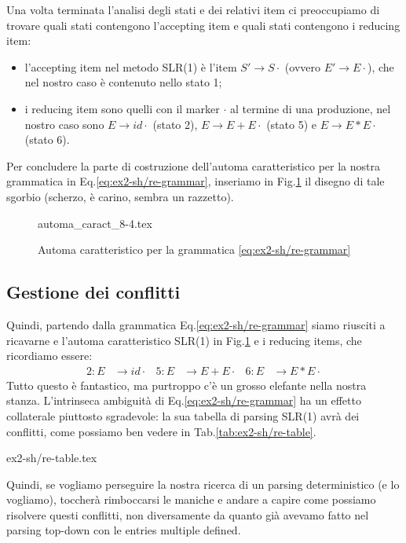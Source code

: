\documentclass[class=book, crop=false, oneside, 12pt]{standalone}
\begin{document}
Una volta terminata l'analisi degli stati e dei relativi item ci preoccupiamo di trovare quali stati contengono l'accepting item e quali stati contengono i reducing item:
\begin{itemize}
    \item l'accepting item nel metodo SLR(1) è l'item \(S' \to S\cdot \) (ovvero \(E' \to E\cdot \)), che nel nostro caso è contenuto nello stato 1;
    \item i reducing item sono quelli con il marker \(\cdot\) al termine di una produzione, nel nostro caso sono \(E \to id \cdot\) (stato 2), \(E \to E+E \cdot\) (stato 5) e \(E \to E*E \cdot\) (stato 6).
\end{itemize}

Per concludere la parte di costruzione dell'automa caratteristico per la nostra grammatica in Eq.\ref{eq:ex2-sh/re-grammar}, inseriamo in Fig.\ref{fig:ex2-sh/re-automata} il disegno di tale sgorbio (scherzo, è carino, sembra un razzetto).
\begin{figure}[H]
    \center
	{automa_caract_8-4.tex}
    \caption{Automa caratteristico per la grammatica \ref{eq:ex2-sh/re-grammar}}
    \label{fig:ex2-sh/re-automata}
\end{figure}

\subsection{Gestione dei conflitti}
\label{subsec:precedence-conflicts}
Quindi, partendo dalla grammatica Eq.\ref{eq:ex2-sh/re-grammar} siamo riusciti a ricavarne e l'automa caratteristico SLR(1) in Fig.\ref{fig:ex2-sh/re-automata} e i reducing items, che ricordiamo essere:
\begin{align*}
    2: E &\to id \cdot & 5: E &\to E + E \cdot & 6: E &\to E * E \cdot
\end{align*}
Tutto questo è fantastico, ma purtroppo c'è un grosso elefante nella nostra stanza. L'intrinseca ambiguità di Eq.\ref{eq:ex2-sh/re-grammar} ha un effetto collaterale piuttosto sgradevole: la sua tabella di parsing SLR(1) avrà dei conflitti, come possiamo ben vedere in Tab.\ref{tab:ex2-sh/re-table}.
\begin{table}[H]
    \centering
    {ex2-sh/re-table.tex}
    \caption{tabella di parsing SLR(1) per la grammatica \ref{eq:ex2-sh/re-grammar}}
    \label{tab:ex2-sh/re-table}
\end{table}
\noindent Quindi, se vogliamo perseguire la nostra ricerca di un parsing deterministico (e lo vogliamo), toccherà rimboccarsi le maniche e andare a capire come possiamo risolvere questi conflitti, non diversamente da quanto già avevamo fatto nel parsing top-down con le entries multiple defined.
\end{document}
